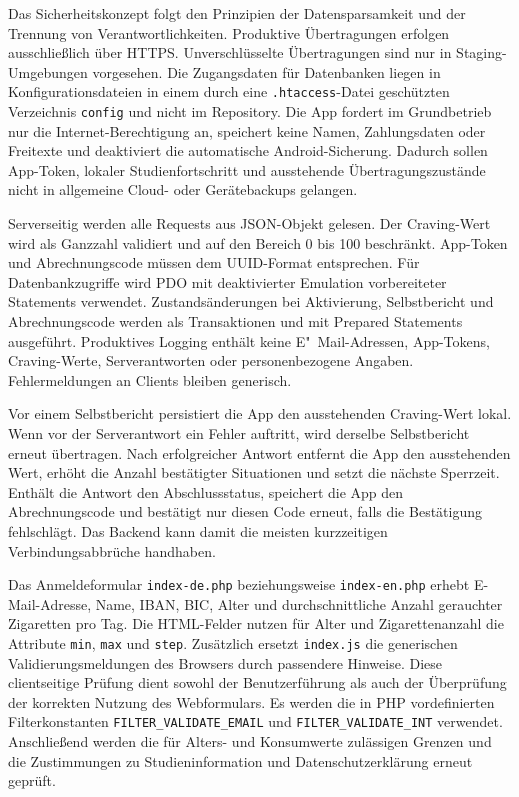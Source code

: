 Das Sicherheitskonzept folgt den Prinzipien der Datensparsamkeit und der Trennung von Verantwortlichkeiten. Produktive Übertragungen erfolgen ausschließlich über HTTPS. Unverschlüsselte Übertragungen sind nur in Staging-Umgebungen vorgesehen. Die Zugangsdaten für Datenbanken liegen in Konfigurationsdateien in einem durch eine \texttt{.htaccess}-Datei geschützten Ver\-zeichnis \texttt{config} und nicht im Repository. Die App fordert im Grundbetrieb nur die Inter\-net-Be\-rech\-ti\-gung an, speichert keine Namen, Zahlungsdaten oder Freitexte und deaktiviert die automatische An\-droid-Sicherung. Dadurch sollen App-Token, lokaler Studienfortschritt und ausstehende Übertragungszustände nicht in allgemeine Cloud- oder Gerätebackups gelangen.

Serverseitig werden alle Requests aus JSON-Objekt gelesen. Der Craving-Wert wird als Ganzzahl validiert und auf den Bereich 0 bis 100 beschränkt. App-Token und Abrechnungscode müssen dem UUID-Format entsprechen. Für Datenbankzugriffe wird PDO mit deaktivierter Emulation vorbereiteter Statements verwendet. Zustandsänderungen bei Aktivierung, Selbstbericht und Abrechnungscode werden als Transaktionen und mit Prepared Statements ausgeführt. Produktives Logging enthält keine E"~Mail-Adressen, App-Tokens, Craving-Werte, Serverantworten oder personenbezogene Angaben. Fehlermeldungen an Clients bleiben generisch.

Vor einem Selbstbericht persistiert die App den ausstehenden Craving-Wert lokal. Wenn vor der Serverantwort ein Fehler auftritt, wird derselbe Selbstbericht erneut übertragen. Nach erfolgreicher Antwort entfernt die App den ausstehenden Wert, erhöht die Anzahl bestätigter Situationen und setzt die nächste Sperrzeit. Enthält die Antwort den Abschlussstatus, speichert die App den Abrechnungscode und bestätigt nur diesen Code erneut, falls die Bestätigung fehlschlägt. Das Backend kann damit die meisten kurzzeitigen Verbindungsabbrüche handhaben. 

Das Anmeldeformular \texttt{index-de.php} beziehungsweise \texttt{index-en.php} erhebt E-Mail-Adres\-se, Name, IBAN, BIC, Alter und durchschnittliche Anzahl gerauchter Zigaretten pro Tag. Die HTML-Felder nutzen für Alter und Zigarettenanzahl die Attribute \texttt{min}, \texttt{max} und \texttt{step}. Zusätzlich ersetzt \texttt{index.js} die generischen Validierungsmeldungen des Browsers durch passendere Hinweise. Diese clientseitige Prüfung dient sowohl der Benutzerführung als auch der Überprüfung der korrekten Nutzung des Webformulars. Es werden die in PHP vordefinierten Filterkonstanten \texttt{FILTER\_VALIDATE\_EMAIL} und \texttt{FILTER\_VALIDATE\_INT} verwendet. Anschließend werden die für Alters- und Konsumwerte zulässigen Grenzen und die Zustimmungen zu Studieninformation und Datenschutzerklärung erneut geprüft.

